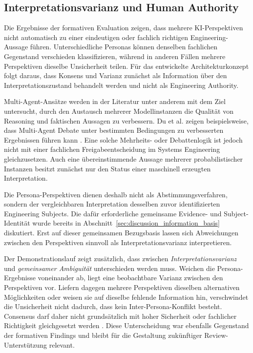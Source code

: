 \subsection{Interpretationsvarianz und Human Authority}
\label{sec:discussion_human_authority}

Die Ergebnisse der formativen Evaluation zeigen, dass mehrere
KI-Perspektiven nicht automatisch zu einer eindeutigen oder fachlich richtigen
Engineering-Aussage führen. Unterschiedliche Personas können denselben
fachlichen Gegenstand verschieden klassifizieren, während in anderen
Fällen mehrere Perspektiven dieselbe Unsicherheit teilen. Für das entwickelte
Architekturkonzept folgt daraus, dass Konsens und Varianz zunächst als
Information über den Interpretationszustand behandelt werden und nicht als
Engineering Authority.

Multi-Agent-Ansätze werden in der Literatur unter anderem mit dem Ziel
untersucht, durch den Austausch mehrerer Modellinstanzen die Qualität von
Reasoning und faktischen Aussagen zu verbessern. Du et al. zeigen
beispielsweise, dass Multi-Agent Debate unter bestimmten Bedingungen zu
verbesserten Ergebnissen führen kann \cite{Du2024}. Eine solche
Mehrheits- oder Debattenlogik ist jedoch nicht mit einer fachlichen
Freigabeentscheidung im Systems Engineering gleichzusetzen. Auch eine
übereinstimmende Aussage mehrerer probabilistischer Instanzen besitzt zunächst
nur den Status einer maschinell erzeugten Interpretation.

Die Persona-Perspektiven dienen deshalb nicht als Abstimmungsverfahren,
sondern der vergleichbaren Interpretation desselben zuvor identifizierten
Engineering Subjects. Die dafür erforderliche gemeinsame Evidence- und
Subject-Identität wurde bereits in
Abschnitt~\ref{sec:discussion_information_basis} diskutiert. Erst auf dieser
gemeinsamen Bezugsbasis lassen sich Abweichungen zwischen den Perspektiven
sinnvoll als Interpretationsvarianz interpretieren.

Der Demonstrationslauf zeigt zusätzlich, dass zwischen
\emph{Interpretationsvarianz} und \emph{gemeinsamer Ambiguität} unterschieden
werden muss. Weichen die Persona-Ergebnisse voneinander ab, liegt eine
beobachtbare Varianz zwischen den Perspektiven vor. Liefern dagegen mehrere
Perspektiven dieselben alternativen Möglichkeiten oder weisen sie auf dieselbe
fehlende Information hin, verschwindet die Unsicherheit nicht dadurch, dass
kein Inter-Persona-Konflikt besteht. Consensus darf daher nicht grundsätzlich mit hoher Sicherheit oder
fachlicher Richtigkeit gleichgesetzt werden \cite{Sunkaraneni2026}.
Diese Unterscheidung war ebenfalls Gegenstand der formativen Findings und
bleibt für die Gestaltung zukünftiger Review-Unterstützung relevant.

